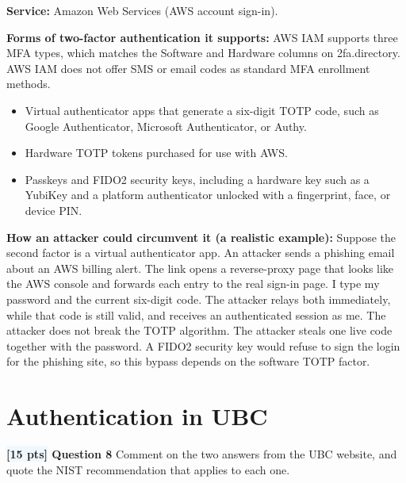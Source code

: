 \documentclass[12pt]{article}
\newcommand{\question}[2]{\textbf{\colorbox{aliceblue}{[#2 pts]} Question #1}}
\begin{document}
\begin{answer}
    \textbf{Service:} Amazon Web Services (AWS account sign-in).

    \textbf{Forms of two-factor authentication it supports:}
    AWS IAM supports three MFA types, which matches the Software and Hardware columns on 2fa.directory. AWS IAM does not offer SMS or email codes as standard MFA enrollment methods.
    \begin{itemize}
        \item Virtual authenticator apps that generate a six-digit TOTP code, such as Google Authenticator, Microsoft Authenticator, or Authy.
        \item Hardware TOTP tokens purchased for use with AWS.
        \item Passkeys and FIDO2 security keys, including a hardware key such as a YubiKey and a platform authenticator unlocked with a fingerprint, face, or device PIN.
    \end{itemize}

    \textbf{How an attacker could circumvent it (a realistic example):}
    Suppose the second factor is a virtual authenticator app.
    An attacker sends a phishing email about an AWS billing alert.
    The link opens a reverse-proxy page that looks like the AWS console and forwards each entry to the real sign-in page.
    I type my password and the current six-digit code.
    The attacker relays both immediately, while that code is still valid, and receives an authenticated session as me.
    The attacker does not break the TOTP algorithm.
    The attacker steals one live code together with the password.
    A FIDO2 security key would refuse to sign the login for the phishing site, so this bypass depends on the software TOTP factor.
\end{answer}

\section{Authentication in UBC}

\question{8}{15} Comment on the two answers from the UBC website, and quote the NIST recommendation that applies to each one.
\end{document}
